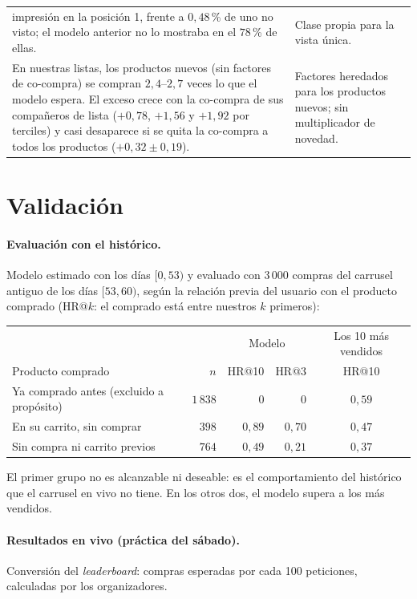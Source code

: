 \documentclass[11pt,a4paper]{article}
\begin{document}
\begin{center}
\begin{tabular}{p{7.4cm}p{7.4cm}}
impresión en la posición 1, frente a $0{,}48$\,\% de uno no visto; el modelo anterior no lo mostraba en el
$78$\,\% de ellas. & Clase propia para la vista única.\\
En nuestras listas, los productos nuevos (sin factores de co-compra) se compran $2{,}4$--$2{,}7$ veces lo
que el modelo espera. El exceso crece con la co-compra de sus compañeros de lista ($+0{,}78$, $+1{,}56$ y
$+1{,}92$ por terciles) y casi desaparece si se quita la co-compra a todos los productos
($+0{,}32\pm0{,}19$). & Factores heredados para los productos nuevos; sin multiplicador de novedad.\\
\bottomrule
\end{tabular}
\end{center}

\section{Validación}

\paragraph{Evaluación con el histórico.} Modelo estimado con los días $[0,53)$ y evaluado con $3\,000$
compras del carrusel antiguo de los días $[53,60)$, según la relación previa del usuario con el
producto comprado (HR@$k$: el comprado está entre nuestros $k$ primeros):

\begin{center}
\small
\begin{tabular}{lrrrc}
\toprule
 & & \multicolumn{2}{c}{Modelo} & Los 10 más vendidos\\
Producto comprado & $n$ & HR@10 & HR@3 & HR@10\\
\midrule
Ya comprado antes (excluido a propósito) & $1\,838$ & $0$ & $0$ & $0{,}59$\\
En su carrito, sin comprar & $398$ & $0{,}89$ & $0{,}70$ & $0{,}47$\\
Sin compra ni carrito previos & $764$ & $0{,}49$ & $0{,}21$ & $0{,}37$\\
\bottomrule
\end{tabular}
\end{center}

El primer grupo no es alcanzable ni deseable: es el comportamiento del histórico que el carrusel en
vivo no tiene. En los otros dos, el modelo supera a los más vendidos.

\paragraph{Resultados en vivo (práctica del sábado).} Conversión del \emph{leaderboard}: compras
esperadas por cada 100 peticiones, calculadas por los organizadores.
\end{document}
